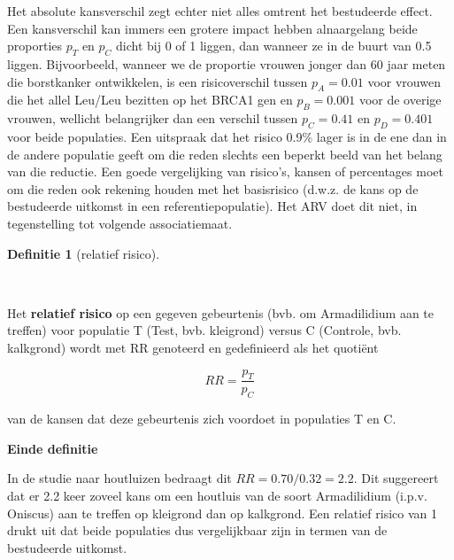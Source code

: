 \documentclass[
  dutch,
  letterpaper,
  12pt]{book}
\theoremstyle{definition}
\theoremstyle{definition}
\newtheorem{definition}{Definitie}[chapter]
\theoremstyle{definition}
\theoremstyle{remark}
\begin{document}
Het absolute kansverschil zegt echter niet alles omtrent het bestudeerde
effect. Een kansverschil kan immers een grotere impact hebben
alnaargelang beide proporties \(p_T\) en \(p_C\) dicht bij 0 of 1
liggen, dan wanneer ze in de buurt van 0.5 liggen. Bijvoorbeeld, wanneer
we de proportie vrouwen jonger dan 60 jaar meten die borstkanker
ontwikkelen, is een risicoverschil tussen \(p_A=0.01\) voor vrouwen die
het allel Leu/Leu bezitten op het BRCA1 gen en \(p_B=0.001\) voor de
overige vrouwen, wellicht belangrijker dan een verschil tussen
\(p_C=0.41\) en \(p_D=0.401\) voor beide populaties. Een uitspraak dat
het risico 0.9\% lager is in de ene dan in de andere populatie geeft om
die reden slechts een beperkt beeld van het belang van die reductie. Een
goede vergelijking van risico's, kansen of percentages moet om die reden
ook rekening houden met het basisrisico (d.w.z. de kans op de
bestudeerde uitkomst in een referentiepopulatie). Het ARV doet dit niet,
in tegenstelling tot volgende associatiemaat.

\begin{definition}[relatief
risico]\protect\hypertarget{def-relatief-risico}{}\label{def-relatief-risico}

~

\end{definition}

Het \textbf{relatief risico} op een gegeven gebeurtenis (bvb. om
Armadilidium aan te treffen) voor populatie T (Test, bvb. kleigrond)
versus C (Controle, bvb. kalkgrond) wordt met RR genoteerd en
gedefinieerd als het quotiënt

\begin{equation*}
RR=\frac{p_T}{p_C}
\end{equation*}

van de kansen dat deze gebeurtenis zich voordoet in populaties T en C.

\textbf{Einde definitie}

In de studie naar houtluizen bedraagt dit \(RR=0.70/0.32=2.2\). Dit
suggereert dat er 2.2 keer zoveel kans om een houtluis van de soort
Armadilidium (i.p.v. Oniscus) aan te treffen op kleigrond dan op
kalkgrond. Een relatief risico van 1 drukt uit dat beide populaties dus
vergelijkbaar zijn in termen van de bestudeerde uitkomst.
\end{document}
